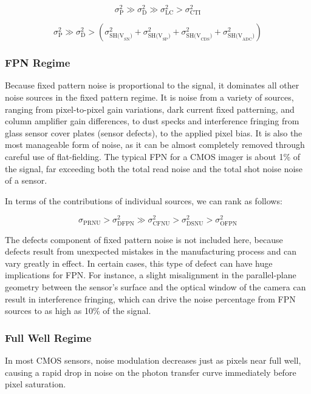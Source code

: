 \documentclass[10pt]{article}
\begin{document}
$$ \sigma^2_{\text{P}} \gg \sigma^2_{\text{D}} \gg \sigma^2_{\text{LC}} > \sigma^2_{\text{CTI}} $$

$$ \sigma^2_{\text{P}} \gg \sigma^2_{\text{D}} >  (\sigma^2_{\text{SH(V}_{\text{SN}})} + \sigma^2_{\text{SH(V}_{\text{SP}})} + \sigma^2_{\text{SH(V}_{\text{CDS}})} + \sigma^2_{\text{SH(V}_{\text{ADC}})}) $$

\subsubsection{FPN Regime}

Because fixed pattern noise is proportional to the signal, it dominates all other noise sources in the fixed pattern regime. It is noise from a variety of sources, ranging from pixel-to-pixel gain variations, dark current fixed patterning, and column amplifier gain differences, to dust specks and interference fringing from glass sensor cover plates (sensor defects), to the applied pixel bias. It is also the most manageable form of noise, as it can be almost completely removed through careful use of flat-fielding. The typical FPN for a CMOS imager is about 1\% of the signal, far exceeding both the total read noise and the total shot noise noise of a sensor.

In terms of the contributions of individual sources, we can rank as follows:

$$ \sigma_{\text{PRNU}} > \sigma^2_{\text{DFPN}} \gg \sigma^2_{\text{CFNU}} > \sigma^2_{\text{DSNU}} > \sigma^2_{\text{OFPN}}$$

\vspace{2mm}

The defects component of fixed pattern noise is not included here, because defects result from unexpected mistakes in the manufacturing process and can vary greatly in effect. In certain cases, this type of defect can have huge implications for FPN. For instance, a slight misalignment in the parallel-plane geometry between the sensor's surface and the optical window of the camera can result in interference fringing, which can drive the noise percentage from FPN sources to as high as 10\% of the signal. 

\subsubsection{Full Well Regime}

In most CMOS sensors, noise modulation decreases just as pixels near full well, causing a rapid drop in noise on the photon transfer curve immediately before pixel saturation. 
\end{document}

